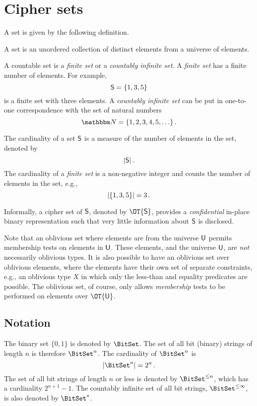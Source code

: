 \documentclass[ ../main.tex]{subfiles}
\begin{document}
\section{Cipher sets}
\label{sec:ob_set_def}
A set is given by the following definition.
\begin{definition}
A set is an unordered collection of distinct elements from a universe of elements.
\end{definition}

A countable set is a \emph{finite set} or a \emph{countably infinite set}. A \emph{finite set} has a finite number of elements. For example,
\[
    \Set{S} = \{ 1, 3, 5 \}
\]
is a finite set with three elements. A \emph{countably infinite set} can be put in one-to-one correspondence with the set of natural numbers
\begin{equation}
    \NatSet = \{1,2,3,4,5,\ldots\}\,.
\end{equation}

The cardinality of a set $\Set{S}$ is a measure of the number of elements in the set, denoted by
\begin{equation}
    \Card{\Set{S}}\,.
\end{equation}
The cardinality of a \emph{finite set} is a non-negative integer and counts the number of elements in the set, e.g.,
\[
    \lvert\left\{ 1, 3, 5\right\}\rvert = 3\,.
\]

Informally, a cipher set of $\Set{S}$, denoted by $\OT{\Set{S}}$, provides a \emph{confidential} in-place binary representation such that very little information about $\Set{S}$ is disclosed.

Note that an oblivious set where elements are from the universe $\Set{U}$ permits membership tests on elements in $\Set{U}$.
These elements, and the universe $\Set{U}$, are \emph{not} necessarily oblivious types.
It is also possible to have an oblivious set over oblivious elements, where the elements have their own set of separate constraints, e.g., an oblivious type $X$ in which only the less-than and equality predicates are possible.
The oblivious set, of course, only allows \emph{membership} tests to be performed on elements over $\OT{\Set{U}}$.

\subsection{Notation}
The binary set $\{0,1\}$ is denoted by $\BitSet$. The set of all bit (binary) strings of length $n$ is therefore $\BitSet^n$. The cardinality of $\BitSet^n$ is
\begin{equation}
\Card{\BitSet^n} = 2^n\,.
\end{equation}
The set of all bit strings of length $n$ or less is denoted by $\BitSet^{\leq n}$, which has a cardinality $2^{n+1}-1$. The countably infinite set of all bit strings, $\BitSet^{\leq \infty}$, is also denoted by $\BitSet^{*}$.
\end{document}
